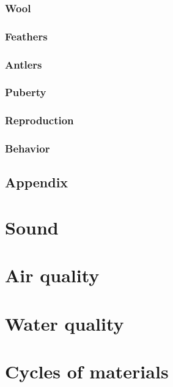 \documentclass[]{book}
\begin{document}
\subsection{Wool}\label{wool}

\subsection{Feathers}\label{feathers}

\subsection{Antlers}\label{antlers}

\subsection{Puberty}\label{puberty}

\subsection{Reproduction}\label{reproduction}

\subsection{Behavior}\label{behavior}

\section{Appendix}\label{appendix}

\chapter{Sound}\label{sound}

\chapter{Air quality}\label{air-quality}

\chapter{Water quality}\label{water-quality}

\chapter{Cycles of materials}\label{cycles-of-materials}
\end{document}

